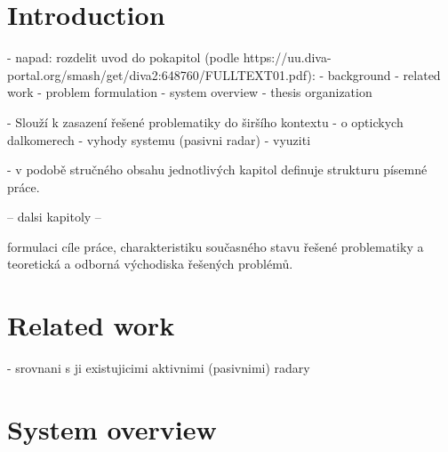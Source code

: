 

\setcounter{secnumdepth}{2}


\chapter{Introduction}

- napad: rozdelit uvod do pokapitol (podle https://uu.diva-portal.org/smash/get/diva2:648760/FULLTEXT01.pdf):
	- background
	- related work
	- problem formulation
	- system overview
	- thesis organization

- Slouží k zasazení řešené problematiky do širšího kontextu
- o optickych dalkomerech
- vyhody systemu (pasivni radar)
- vyuziti

- v podobě stručného obsahu jednotlivých kapitol definuje strukturu písemné práce.


-- dalsi kapitoly --

 formulaci cíle práce, charakteristiku současného stavu
 řešené problematiky a teoretická a odborná východiska řešených problémů.

 

\chapter{Related work}

- srovnani s ji existujicimi aktivnimi (pasivnimi) radary

\chapter{System overview} \label{txt:system_overview}

